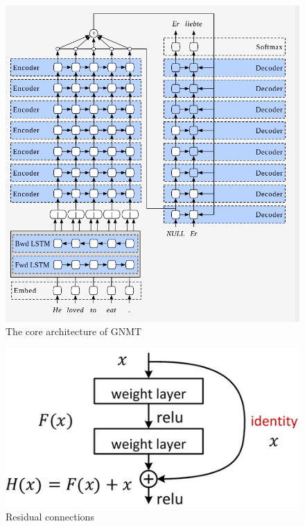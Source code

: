 \documentclass[a4paper]{article}
\begin{document}
\begin{figure}
  \centering
  \includegraphics[width=.9\linewidth]{img/gnmt_1.png}
  \caption{The core architecture of GNMT }
  \label{fig:gnmt1}
\end{figure}


\begin{figure}
  \centering
  \includegraphics[width=.9\linewidth]{img/residual.png}
  \caption{Residual connections}
  \label{fig:residual}
\end{figure}
\end{document}
